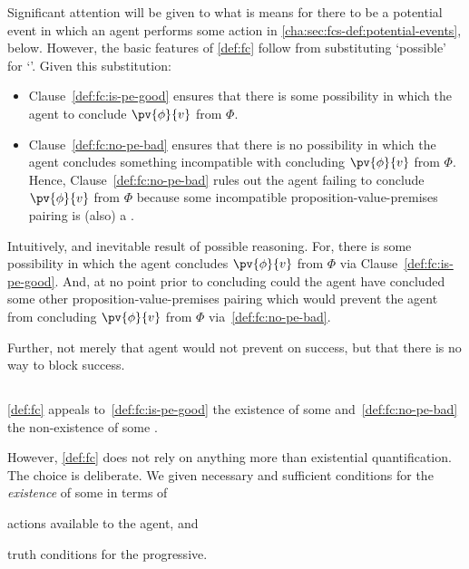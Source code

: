 \begin{note}[Intuition]
  Significant attention will be given to what is means for there to be a potential event in which an agent performs some action in \autoref{cha:sec:fcs-def:potential-events}, below.
  However, the basic features of \autoref{def:fc} follow from substituting `possible' for `\pevent{}'.
  Given this substitution:

  \begin{itemize}[noitemsep]
  \item
    Clause~\ref{def:fc:is-pe-good} ensures that there is some possibility in which the agent to conclude \(\pv{\phi}{v}\) from \(\Phi\).
  \item
    Clause~\ref{def:fc:no-pe-bad} ensures that there is no possibility in which the agent concludes something incompatible with concluding \(\pv{\phi}{v}\) from \(\Phi\).
    Hence, Clause~\ref{def:fc:no-pe-bad} rules out the agent failing to conclude \(\pv{\phi}{v}\) from \(\Phi\) because some incompatible proposition-value-premises pairing is (also) a .
  \end{itemize}

  Intuitively, and inevitable result of possible reasoning.
  For, there is some possibility in which the agent concludes \(\pv{\phi}{v}\) from \(\Phi\) via Clause~\ref{def:fc:is-pe-good}.
  And, at no point prior to concluding could the agent have concluded some other proposition-value-premises pairing which would prevent the agent from concluding \(\pv{\phi}{v}\) from \(\Phi\) via~\ref{def:fc:no-pe-bad}.

  Further, not merely that agent would not prevent on success, but that there is no way to block success.
\end{note}

\subsection{}
\label{cha:sec:fcs-def:potential-events}

\begin{note}
  \autoref{def:fc} appeals to~\ref{def:fc:is-pe-good} the existence of some \pevent{} and~\ref{def:fc:no-pe-bad} the non-existence of some \pevent{}.

  However, \autoref{def:fc} does not rely on anything more than existential quantification.
  The choice is deliberate.
  We given necessary and sufficient conditions for the \emph{existence} of some \pevent{} in terms of
  \begin{enumerate*}[label=(\roman*)]
  \item
    actions available to the agent, and
  \item
    truth conditions for the progressive.
  \end{enumerate*}
\end{note}


